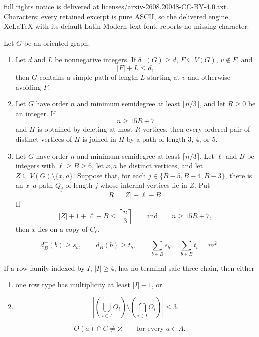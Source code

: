 \documentclass[10pt,a4paper]{amsart}
\begin{document}
full rights notice is delivered at licenses/arxiv-2608.20048-CC-BY-4.0.txt. Characters: every retained excerpt is pure ASCII, so the delivered engine, XeLaTeX with its default Latin Modern text font, reports no missing character.
\begin{lemma}\label{lem:extension-deletion}
Let $G$ be an oriented graph.
\begin{enumerate}
\item Let $d$ and $L$ be nonnegative integers.  If
$\delta^+(G)\ge d$, $F\subseteq V(G)$, $v\notin F$, and
\[
  |F|+L\le d,
\]
then $G$ contains a simple path of length $L$ starting at $v$ and otherwise avoiding $F$.
\item Let $G$ have order $n$ and minimum semidegree at least
$\lceil n/3\rceil$, and let $R\ge0$ be an integer.  If
\[
  n\ge15R+7
\]
and $H$ is obtained by deleting at most $R$ vertices, then every
ordered pair of distinct vertices of $H$ is joined in $H$ by a path
of length $3$, $4$, or $5$.
\item Let $G$ have order $n$ and minimum semidegree at least
$\lceil n/3\rceil$.  Let $\ell$ and $B$ be integers with
$\ell\ge B\ge6$, let $x,a$ be distinct
vertices, and let $Z\subseteq V(G)\setminus\{x,a\}$.  Suppose that,
for each $j\in\{B-5,B-4,B-3\}$, there is an $x$--$a$ path $Q_j$ of
length $j$ whose internal vertices lie in $Z$.  Put
\[
  R=|Z|+\ell-B.
\]
If
\[
  |Z|+1+\ell-B\le\left\lceil\frac n3\right\rceil
  \qquad\text{and}\qquad
  n\ge15R+7,
\]
then $x$ lies on a copy of $C_\ell$.
\end{enumerate}
\end{lemma}

\begin{equation}\label{eq:bookkeeping}
  d_B^+(b)\ge s_b,\qquad d_B^-(b)\ge t_b,\qquad
  \sum_{b\in B}s_b=\sum_{b\in B}t_b=m^2.
\end{equation}

\begin{corollary}\label{cor:stability}
If a row family indexed by $I$, $|I|\ge4$, has no terminal-safe three-chain, then either
\begin{enumerate}
\item one row type has multiplicity at least $|I|-1$, or
\item
\[
  \left|\left(\bigcup_{i\in I}O_i\right)
  \setminus\left(\bigcap_{i\in I}O_i\right)\right|\le3.
\]
\end{enumerate}
\end{corollary}

\begin{equation}\label{eq:row-meets-C}
  O(a)\cap C\ne\varnothing
  \qquad\text{for every }a\in A.
\end{equation}
\end{document}
